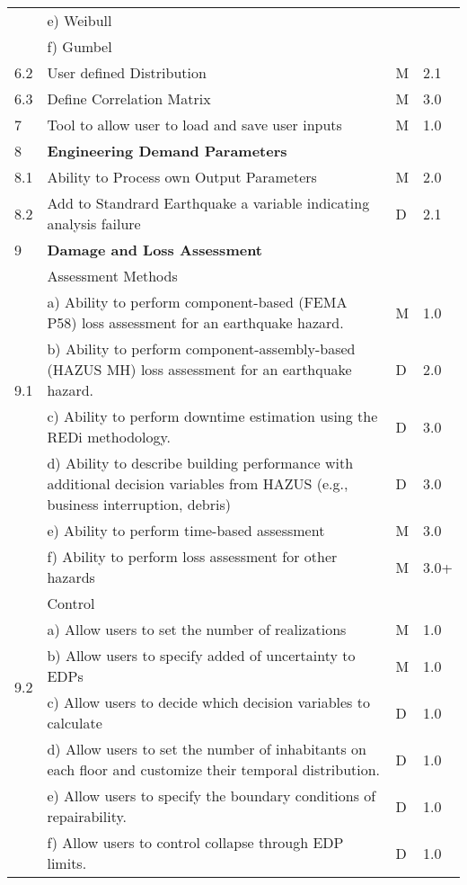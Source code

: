 {\begin{longtable}{| p{} | p{} | p{} | p{} |}
	 & e)     Weibull &  &  \\ 
	 & f)     Gumbel &  &  \\ \hline
	6.2 & User defined Distribution & M & 2.1 \\ \hline
	6.3 & Define Correlation Matrix & M & 3.0 \\ \hline
	7 & Tool to allow user to load and save user inputs & M & 1.0 \\ \hline
	8 & \textbf{Engineering Demand Parameters} &  &  \\ \hline
	8.1 & Ability to Process own Output Parameters & M & 2.0  \\ \hline
	8.2 & Add to Standrard Earthquake a variable indicating analysis failure & D & 2.1  \\ \hline
    9 & \textbf{Damage and Loss Assessment} & & \\ \hline
    \multirow{5}{*}{9.1} & Assessment Methods & & \\
     & a) Ability to perform component-based (FEMA P58) loss assessment for an earthquake hazard. & M & 1.0 \\
     & b) Ability to perform component-assembly-based (HAZUS MH) loss assessment for an earthquake hazard. & D & 2.0 \\
     & c) Ability to perform downtime estimation using the REDi methodology. & D & 3.0 \\
     & d) Ability to describe building performance with additional decision variables from HAZUS (e.g., business interruption, debris) & D & 3.0 \\
     & e) Ability to perform time-based assessment & M & 3.0 \\
     & f) Ability to perform loss assessment for other hazards & M & 3.0+ \\ \hline
    \multirow{5}{*}{9.2} & Control & & \\
     & a) Allow users to set the number of realizations & M & 1.0\\
     & b) Allow users to specify added of uncertainty to EDPs & M & 1.0 \\
     & c) Allow users to decide which decision variables to calculate & D & 1.0 \\
     & d) Allow users to set the number of inhabitants on each floor and customize their temporal distribution. & D & 1.0 \\
     & e) Allow users to specify the boundary conditions of repairability. & D & 1.0 \\
     & f) Allow users to control collapse through EDP limits. & D & 1.0\\

\end{longtable}}
